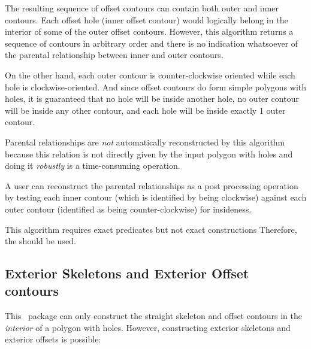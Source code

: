 The resulting sequence of offset contours can contain both outer and inner contours. 
Each offset hole (inner offset contour) would logically belong in the interior of some 
of the outer offset contours.
However, this algorithm returns a sequence of contours in arbitrary order and there is no
indication whatsoever of the parental relationship between inner and outer contours.

On the other hand, each outer contour is counter-clockwise oriented while each hole is clockwise-oriented.
And since offset contours do form simple polygons with holes, it is guaranteed that no hole will be inside another hole, no outer contour will be inside any other contour, and each hole will be inside exactly 1 outer contour.

Parental relationships are {\em not} automatically reconstructed by this algorithm because this relation is not directly given by the input polygon with holes and doing it \textit{robustly} is a time-consuming operation.

A user can reconstruct the parental relationships as a post processing operation 
by testing each inner contour (which is identified by being clockwise) against each outer contour (identified as being counter-clockwise) for insideness.

This algorithm requires exact predicates but not exact constructions
Therefore, the  should be used.

\subsection{Exterior Skeletons and Exterior Offset contours}  

This \cgal\ package can only construct the straight skeleton and offset contours in the \textit{interior} of a polygon with holes. However, constructing exterior skeletons and exterior offsets is possible:

